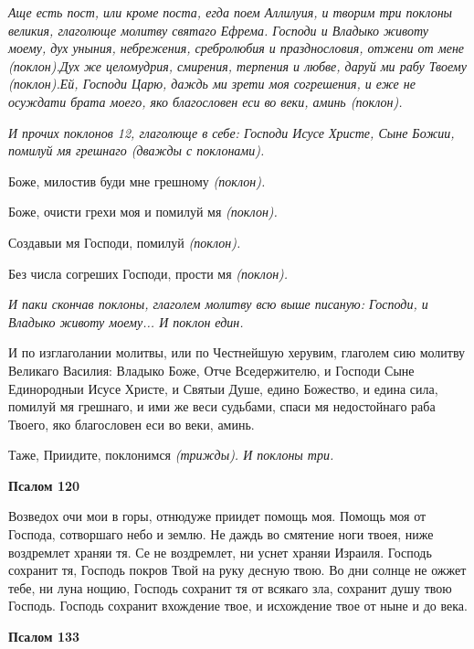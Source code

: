 \itshape Аще есть пост, или кроме поста, егда поем Аллилуия, и творим три поклоны великия, глаголюще молитву святаго Ефрема\normalfont{}. Господи и Владыко животу моему, дух уныния, небрежения, сребролюбия и празднословия, отжени от мене \itshape (поклон)\normalfont{}.Дух же целомудрия, смирения, терпения и любве, даруй ми рабу Твоему \itshape (поклон)\normalfont{}.Ей, Господи Царю, даждь ми зрети моя согрешения, и еже не осуждати брата моего, яко благословен еси во веки, аминь \itshape (поклон)\normalfont{}.


\itshape И прочих поклонов 12, глаголюще в себе:\normalfont{} Господи Исусе Христе, Сыне Божии, помилуй мя грешнаго (дважды с поклонами).


Боже, милостив буди мне грешному \itshape (поклон)\normalfont{}.


Боже, очисти грехи моя и помилуй мя \itshape (поклон)\normalfont{}.


Создавыи мя Господи, помилуй \itshape (поклон)\normalfont{}.


Без числа согреших Господи, прости мя \itshape (поклон)\normalfont{}.


\itshape И паки скончав поклоны, глаголем молитву всю выше писаную:\normalfont{} Господи, и Владыко животу моему... И поклон един.


И по изглаголании молитвы, или по Честнейшую херувим, глаголем сию молитву Великаго Василия: Владыко Боже, Отче Вседержителю, и Господи Сыне Единородныи Исусе Христе, и Святыи Душе, едино Божество, и едина сила, помилуй мя грешнаго, и ими же веси судьбами, спаси мя недостойнаго раба Твоего, яко благословен еси во веки, аминь.


Таже, Приидите, поклонимся \itshape (трижды)\normalfont{}. И поклоны три.





\bfseries Псалом 120\normalfont{}


Возведох очи мои в горы, отнюдуже приидет помощь моя. Помощь моя от Господа, сотворшаго небо и землю. Не даждь во смятение ноги твоея, ниже воздремлет храняи тя. Се не воздремлет, ни уснет храняи Израиля. Господь сохранит тя, Господь покров Твой на руку десную твою. Во дни солнце не ожжет тебе, ни луна нощию, Господь сохранит тя от всякаго зла, сохранит душу твою Господь. Господь сохранит вхождение твое, и исхождение твое от ныне и до века.





\bfseries Псалом 133\normalfont{}


